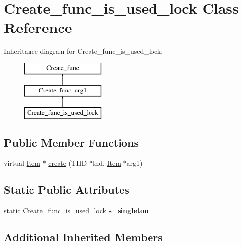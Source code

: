 \hypertarget{classCreate__func__is__used__lock}{}\section{Create\+\_\+func\+\_\+is\+\_\+used\+\_\+lock Class Reference}
\label{classCreate__func__is__used__lock}
Inheritance diagram for Create\+\_\+func\+\_\+is\+\_\+used\+\_\+lock\+:\begin{figure}[H]
\begin{center}
\leavevmode
\includegraphics[height=3.000000cm]{classCreate__func__is__used__lock}
\end{center}
\end{figure}
\subsection*{Public Member Functions}
\begin{DoxyCompactItemize}
\item 
virtual \mbox{\hyperlink{classItem}{Item}} $\ast$ \mbox{\hyperlink{classCreate__func__is__used__lock_a99fd30eacf376485a6cf4a176b4b1ff9}{create}} (T\+HD $\ast$thd, \mbox{\hyperlink{classItem}{Item}} $\ast$arg1)
\end{DoxyCompactItemize}
\subsection*{Static Public Attributes}
\begin{DoxyCompactItemize}
\item 
\mbox{\label{classCreate__func__is__used__lock_a8a5a1c8f24dff97a14a6adfbc86dd098}} 
static \mbox{\hyperlink{classCreate__func__is__used__lock}{Create\+\_\+func\+\_\+is\+\_\+used\+\_\+lock}} {\bfseries s\+\_\+singleton}
\end{DoxyCompactItemize}
\subsection*{Additional Inherited Members}


